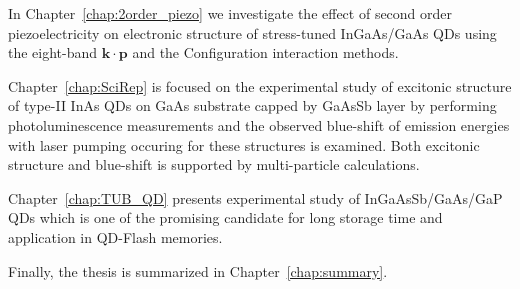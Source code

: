 \documentclass[
a4paper, %
11pt, %
onecolumn, %
openany, %
oldfontcommands,
]{memoir}
\begin{document}
In Chapter~\ref{chap:2order_piezo} we investigate the effect of second order piezoelectricity on electronic %
structure of stress-tuned InGaAs/GaAs QDs using the eight-band $\mathbf{k \cdot p}$ and the Configuration interaction methods.

Chapter~\ref{chap:SciRep} is focused on the experimental study of excitonic structure of type-II InAs QDs on GaAs substrate capped by GaAsSb layer by performing photoluminescence measurements and the observed blue-shift of emission energies with laser pumping occuring for these structures is examined. Both excitonic structure and blue-shift is supported by multi-particle calculations.

Chapter~\ref{chap:TUB_QD} presents experimental study of InGaAsSb/GaAs/GaP QDs which is one of the promising candidate for long storage time and application in QD-Flash memories.  

Finally, the thesis is summarized in Chapter~\ref{chap:summary}.
\newpage 




\mainmatter

%






\appendix





%







\backmatter



%
%
%


\end{document}
